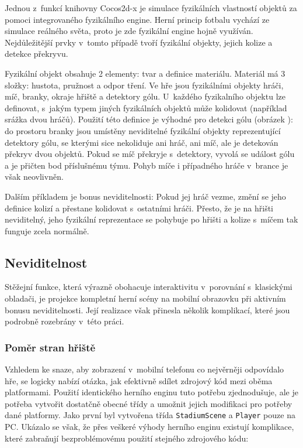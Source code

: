 \documentclass[thesis=B,czech,hidelinks]{FITthesis}[2012/06/26] %
\newcommand{\code}[1]{\texttt{#1}}
\begin{document}
Jednou z~funkcí knihovny Cocos2d-x je simulace fyzikálních vlastností objektů za pomoci integrovaného fyzikálního engine. Herní princip fotbalu vychází ze simulace reálného světa, proto je zde fyzikální engine hojně využíván. Nejdůležitější prvky v~tomto případě tvoří fyzikální objekty, jejich kolize a detekce překryvu.

Fyzikální objekt obsahuje 2 elementy: tvar a definice materiálu. Materiál má 3 složky: hustota, pružnost a odpor tření. Ve hře jsou fyzikálními objekty hráči, míč, branky, okraje hřiště a detektory gólu. U~každého fyzikalního objektu lze definovat, s~jakým typem jiných fyzikálních objektů může kolidovat (například srážka dvou hráčů). Použití této definice je výhodné pro detekci gólu (obrázek ): do prostoru branky jsou umístěny neviditelné fyzikální objekty reprezentující detektory gólu, se kterými sice nekoliduje ani hráč, ani míč, ale je detekován překryv dvou objektů. Pokud se míč překryje s~detektory, vyvolá se událost gólu a je přičten bod příslušnému týmu. Pohyb míče i případného hráče v~brance je však neovlivněn.

Dalším příkladem je bonus neviditelnosti: Pokud jej hráč vezme, změní se jeho definice kolizí a přestane kolidovat s~ostatními hráči. Přesto, že je na hřišti neviditelný, jeho fyzikální reprezentace se pohybuje po hřišti a kolize s~míčem tak funguje zcela normálně.

\subsection{Neviditelnost}

Stěžejní funkce, která výrazně obohacuje interaktivitu v~porovnání s~klasickými obladači, je projekce kompletní herní scény na mobilní obrazovku při aktivním bonusu neviditelnosti. Její realizace však přinesla několik komplikací, které jsou podrobně rozebrány v~této práci. 

\subsubsection{Poměr stran hřiště}

Vzhledem ke snaze, aby zobrazení v~mobilní telefonu co nejvěrněji odpovídalo hře, se logicky nabízí otázka, jak efektivně sdílet zdrojový kód mezi oběma platformami. Použití identického herního enginu tuto potřebu zjednodušuje, ale je potřeba vytvořit dostatčně obecné třídy a umožnit jejich modifikaci pro potřeby dané platformy. Jako první byl vytvořena třída \code{StadiumScene} a \code{Player} pouze na PC. Ukázalo se však, že přes veškeré výhody herního enginu existují komplikace, které zabraňují bezproblémovému použití stejného zdrojového kódu:
\end{document}
